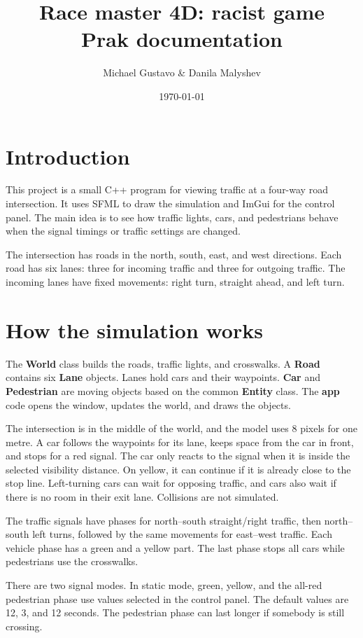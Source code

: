 \documentclass[12pt,a4paper]{article}
\title{Race master 4D: racist game\\[0.3em]
	\large Prak documentation}
\author{Michael Gustavo \& Danila Malyshev}
\date{\today}
\begin{document}
	
	\maketitle
	
	\section{Introduction}
	
	This project is a small C++ program for viewing traffic at a four-way road intersection. It uses SFML to draw the simulation and ImGui for the control panel. The main idea is to see how traffic lights, cars, and pedestrians behave when the signal timings or traffic settings are changed.
	
	The intersection has roads in the north, south, east, and west directions. Each road has six lanes: three for incoming traffic and three for outgoing traffic. The incoming lanes have fixed movements: right turn, straight ahead, and left turn. 
	
	\section{How the simulation works}
	
	The \textbf{World} class builds the roads, traffic lights, and crosswalks. A \textbf{Road} contains six \textbf{Lane} objects. Lanes hold cars and their waypoints. \textbf{Car} and \textbf{Pedestrian} are moving objects based on the common \textbf{Entity} class. The \textbf{app} code opens the window, updates the world, and draws the objects.
	
	The intersection is in the middle of the world, and the model uses 8 pixels for one metre. A car follows the waypoints for its lane, keeps space from the car in front, and stops for a red signal. The car only reacts to the signal when it is inside the selected visibility distance. On yellow, it can continue if it is already close to the stop line. Left-turning cars can wait for opposing traffic, and cars also wait if there is no room in their exit lane. Collisions are not
	simulated.
	
	The traffic signals have phases for north--south straight/right traffic, then
	north--south left turns, followed by the same movements for east--west traffic.
	Each vehicle phase has a green and a yellow part. The last phase stops all cars
	while pedestrians use the crosswalks.
	
	There are two signal modes. In static mode, green, yellow, and the all-red
	pedestrian phase use values selected in the control panel. The default values
	are 12, 3, and 12 seconds. The pedestrian phase can last longer if somebody is
	still crossing.
	
\end{document}
